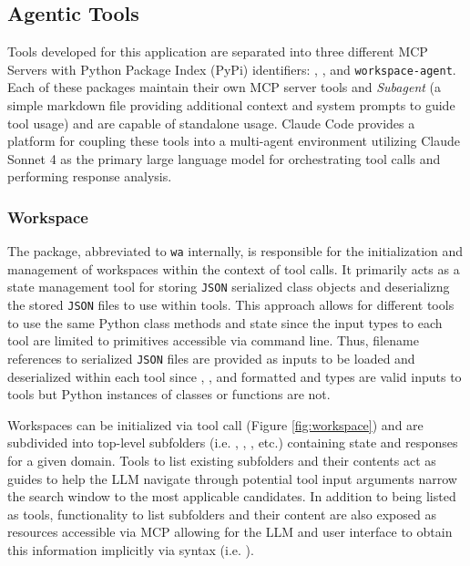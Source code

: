 \subsection{Agentic Tools}
Tools developed for this application are separated into three different MCP
Servers with Python Package Index (PyPi) identifiers:
\texttt{}, \texttt{}, and
\texttt{workspace-agent}. Each of these packages maintain their own MCP server
tools and \textit{Subagent} (a simple markdown file providing additional context
and system prompts to guide tool usage) and are capable of standalone usage.
Claude Code provides a platform for coupling these tools into a multi-agent
environment utilizing Claude Sonnet 4 as the primary large language model for
orchestrating tool calls and performing response analysis. 

\subsubsection{Workspace}
The \texttt{} package, abbreviated to \texttt{wa}
internally, is responsible for the initialization and management of workspaces
within the context of tool calls. It primarily acts as a state management tool
for storing \texttt{JSON} serialized class objects and deserializng the stored
\texttt{JSON} files to use within tools. This approach allows for different
tools to use the same Python class methods and state since the input types to
each tool are limited to primitives accessible via command line. Thus, filename
references to serialized \texttt{JSON} files are provided as inputs to be loaded
and deserialized within each tool since , , and formatted
 and  types are valid inputs to tools but Python instances
of classes or functions are not.

Workspaces can be initialized via tool call (Figure \ref{fig:workspace}) and are
subdivided into top-level subfolders (i.e. \texttt{},
\texttt{}, \texttt{}, etc.)
containing state and responses for a given domain. Tools to list existing
subfolders and their contents act as guides to help the LLM navigate through
potential tool input arguments narrow the search window to the most applicable
candidates. In addition to being listed as tools, functionality to list
subfolders and their content are also exposed as resources accessible via MCP
allowing for the LLM and user interface to obtain this information implicitly
via syntax (i.e.
\texttt{}).

